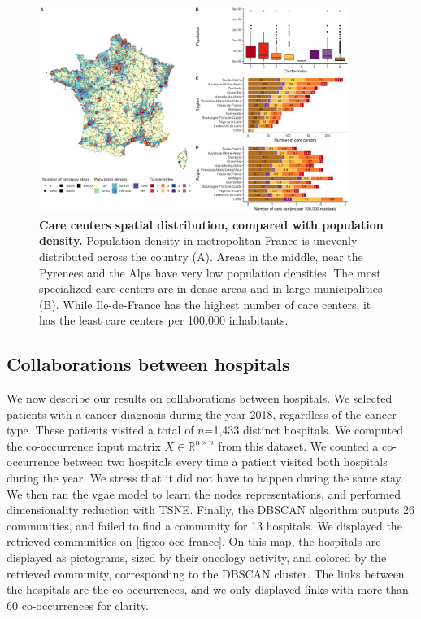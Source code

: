 \begin{figure}[h!]
    \includegraphics[width=0.9\textwidth]{images/camion/supplemental/sup_fig4_care_centers_pop_density.png}
    \centering
    \caption{ \textbf{Care centers spatial distribution, compared with
            population density.} Population density in metropolitan France is
        unevenly distributed across the country (A). Areas in the middle, near
        the Pyrenees and the Alps have very low population densities. The most
        specialized care centers are in dense areas and in large municipalities
        (B). While Ile-de-France has the highest number of care centers, it has
        the least care centers per 100,000 inhabitants. }
    \label{fig:clustering-map}
\end{figure}

\subsection{Collaborations between hospitals}

We now describe our results on collaborations between hospitals. We selected
patients with a cancer diagnosis during the year 2018, regardless of the cancer
type. These patients visited a total of $n$=1,433 distinct hospitals. We
computed the co-occurrence input matrix $X \in \mathbb{R}^{n \times n}$ from
this dataset. We counted a co-occurrence between two hospitals every time a
patient visited both hospitals during the year. We stress that it did not have
to happen during the same stay. We then ran the \ac{vgae} model to learn the
nodes representations, and performed dimensionality reduction with TSNE.
Finally, the DBSCAN algorithm outputs 26 communities, and failed to find a
community for 13 hospitals. We displayed the retrieved communities on
\cref{fig:co-occ-france}. On this map, the hospitals are displayed as
pictograms, sized by their oncology activity, and colored by the retrieved
community, corresponding to the DBSCAN cluster. The links between the hospitals
are the co-occurrences, and we only displayed links with more than 60
co-occurrences for clarity.

